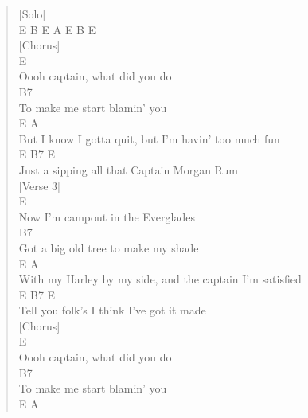 \documentclass[11pt]{article}
\begin{document}
\begin{verse}
[Solo]\\
E B E A E B E\\
\vspace*{1em}
\vspace*{1em}
\vspace*{1em}
[Chorus]\\
E\\
Oooh captain, what did you do\\
\hspace*{25em}B7\\
To make me start blamin' you\\
\hspace*{4em}E                            A\\
But I know I gotta quit, but I'm havin' too much fun\\
\hspace*{9em}E              B7             E\\
Just a sipping all that Captain Morgan Rum\\
\vspace*{1em}
\vspace*{1em}
\vspace*{1em}
[Verse 3]\\
E\\
Now I'm campout in the Everglades\\
\hspace*{30em}B7\\
Got a big old tree to make my shade\\
\hspace*{8em}E                          A\\
With my Harley by my side, and the captain I'm satisfied\\
\hspace*{9em}E         B7               E\\
Tell you folk's I think I've got it made\\
\vspace*{1em}
\vspace*{1em}
\vspace*{1em}
[Chorus]\\
E\\
Oooh captain, what did you do\\
\hspace*{25em}B7\\
To make me start blamin' you\\
\hspace*{4em}E                            A\\

\end{verse}
\end{document}
